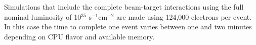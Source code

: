 \noindent Simulations that include the complete beam-target interactions using the full nominal luminosity
of 10$^{35}$ s$^{-1}$cm$^{-2}$ are made using 124,000 electrons per event. In this case the time to complete one event varies
between one and two minutes depending on CPU flavor and available memory.

































